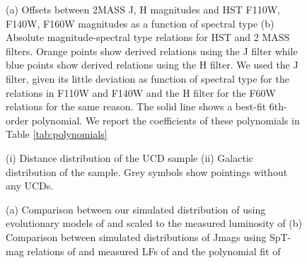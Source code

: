 \documentclass[manuscript]{aastex63}
\begin{document}
%
\begin{figure}
    \centering
    \caption{ (a) Offsets between 2MASS J, H magnitudes and HST F110W, F140W, F160W magnitudes as a function of spectral type (b) Absolute  magnitude-spectral type relations for HST and 2 MASS filters. Orange points show derived relations using the J filter while blue points show derived relations using the H filter. We used the J filter, given its little deviation as function of spectral type for the relations in F110W and F140W and the H filter for the F60W relations for the same reason. The solid line shows a best-fit 6th-order polynomial. We report the coefficients of these polynomials in Table \ref{tab:polynomials}}
    \label{fig:absmagrelations}
\end{figure}

\begin{figure}
    \centering
    \caption{ (i) Distance distribution of the UCD sample
    (ii) Galactic distribution of the sample. Grey symbols show pointings without any UCDs.}
    \label{fig:candidedistances}
\end{figure}


\begin{figure}
\centering
{}
\caption{(a) Comparison between our simulated distribution of \teff using evolutionary models of \cite{2008ApJ...689.1327S} and 
\cite{2003A&A...402..701B} scaled to the measured luminosity of \cite{2019ApJS..240...19K} (b) Comparison between simulated distributions of Jmags using SpT-mag relations of \cite{2012ApJS..201...19D} and measured LFs of \cite{2019arXiv190604166B,2007astro.ph..2034C} and the polynomial fit of \cite{2016AJ....151...92R}}
\label{fig:lf}
\end{figure}

\end{document}
